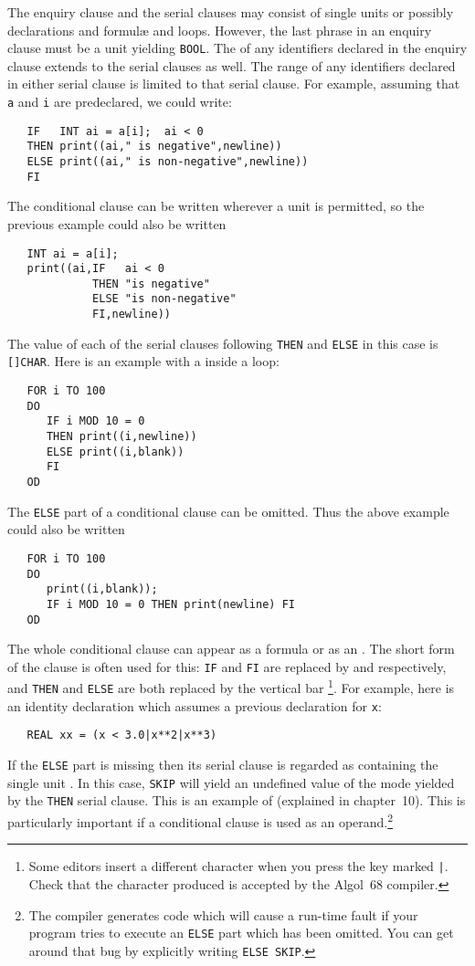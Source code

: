 The enquiry clause and the serial clauses may consist of single units
or possibly declarations and formul{\ae} and loops. However, the last
phrase in an enquiry clause must be a unit yielding \verb|BOOL|. The
 of any identifiers declared in the enquiry clause extends
to the serial clauses as well.  The range of any identifiers declared
in either serial clause is limited to that serial clause.  For
example, assuming that \verb|a| and \verb|i| are predeclared, we
could write:
\begin{verbatim}
   IF   INT ai = a[i];  ai < 0
   THEN print((ai," is negative",newline))
   ELSE print((ai," is non-negative",newline))
   FI
\end{verbatim}
\noindent
The conditional clause can be written wherever a unit is permitted,
so the previous example could also be written
\begin{verbatim}
   INT ai = a[i];
   print((ai,IF   ai < 0
             THEN "is negative"
             ELSE "is non-negative"
             FI,newline))
\end{verbatim}
\noindent
The value of each of the serial clauses following \verb|THEN| and
\verb|ELSE| in this case is \verb|[]CHAR|. Here is an example with a
 inside a loop:
\begin{verbatim}
   FOR i TO 100
   DO
      IF i MOD 10 = 0
      THEN print((i,newline))
      ELSE print((i,blank))
      FI
   OD
\end{verbatim}
\noindent
The \verb|ELSE| part of a conditional clause can be omitted. Thus the
above example could also be written
\begin{verbatim}
   FOR i TO 100
   DO
      print((i,blank));
      IF i MOD 10 = 0 THEN print(newline) FI
   OD
\end{verbatim}

The whole conditional clause can appear as a formula or as an
.  The short form of the clause is often used for this:
\verb|IF| and \verb|FI| are replaced by \ixtt{(} and \ixtt{)}
respectively, and \verb|THEN| and \verb|ELSE| are both replaced by
the vertical bar %
\footnote{Some editors insert a different character when you press
the key marked \texttt{|}. Check that the character produced is
accepted by the Algol~68 compiler.}. For example, here is an identity
declaration which assumes a previous declaration for \verb|x|:
\begin{verbatim}
   REAL xx = (x < 3.0|x**2|x**3)
\end{verbatim}
\noindent
If the \verb|ELSE| part is missing then its serial clause is regarded
as containing the single unit .  In this case, \verb|SKIP|
will yield an undefined value of the mode yielded by the \verb|THEN|
serial clause.  This is an example of  (explained in
chapter~10).  This is particularly important if a conditional clause
is used as an operand.\footnote{The
\protect{} compiler
generates code which will cause a run-time fault if your program
tries to execute an \texttt{ELSE} part which has been omitted. You can
get around that bug by explicitly writing \texttt{ELSE SKIP}.}

